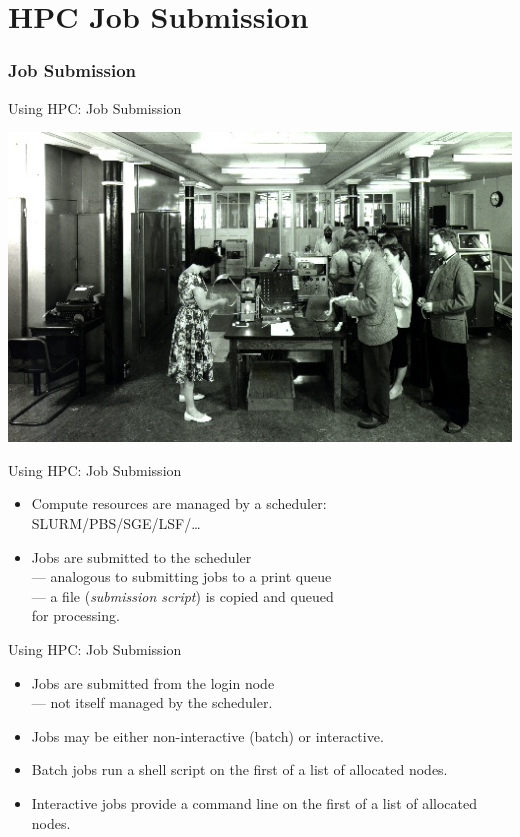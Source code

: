 \part{HPC Job Submission}
\begin{frame}
\partpage
\end{frame}

\section{Job Submission}
\begin{frame}{Using HPC: Job Submission}
\centerline{\includegraphics[width=1\textwidth]{imgs/EDSAC_2_1960.jpg}}
\end{frame}
\begin{frame}{Using HPC: Job Submission}
\begin{itemize}
\item{Compute resources are managed by a scheduler:\hfill\\\qquad\alert{SLURM}/PBS/SGE/LSF/\ldots}
\item{Jobs are submitted to the scheduler\hfill\\\qquad --- analogous to submitting jobs to a print queue\hfill\\\qquad --- a file (\emph{submission script}) is copied and queued\hfill\\\qquad \hphantom{---} for processing.}
\end{itemize}
\end{frame}

\begin{frame}{Using HPC: Job Submission}
\begin{itemize}
\item{Jobs are submitted from the \alert{login node}\hfill\\\qquad  --- not itself managed by the scheduler.}
\item{Jobs may be either non-interactive (\alert{batch}) or \alert{interactive}.}
\pause
\item{\alert{Batch} jobs run a shell script on the first of a list of allocated nodes.}
\item{\alert{Interactive} jobs provide a command line on the first of a list of allocated nodes.}
\end{itemize}
\end{frame}

